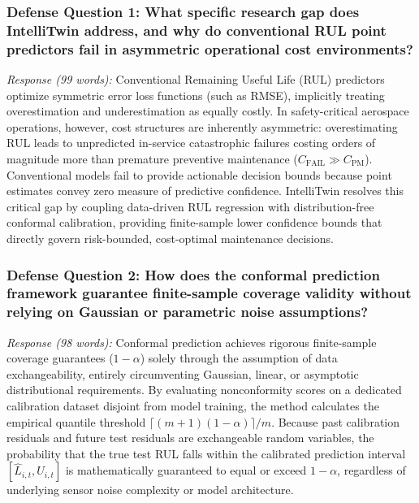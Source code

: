 \documentclass[12pt,a4paper]{article}
\begin{document}
\subsubsection*{Defense Question 1: What specific research gap does IntelliTwin address, and why do conventional RUL point predictors fail in asymmetric operational cost environments?}
\textit{Response (99 words):} Conventional Remaining Useful Life (RUL) predictors optimize symmetric error loss functions (such as RMSE), implicitly treating overestimation and underestimation as equally costly. In safety-critical aerospace operations, however, cost structures are inherently asymmetric: overestimating RUL leads to unpredicted in-service catastrophic failures costing orders of magnitude more than premature preventive maintenance ($C_{\text{FAIL}} \gg C_{\text{PM}}$). Conventional models fail to provide actionable decision bounds because point estimates convey zero measure of predictive confidence. IntelliTwin resolves this critical gap by coupling data-driven RUL regression with distribution-free conformal calibration, providing finite-sample lower confidence bounds that directly govern risk-bounded, cost-optimal maintenance decisions.

\subsubsection*{Defense Question 2: How does the conformal prediction framework guarantee finite-sample coverage validity without relying on Gaussian or parametric noise assumptions?}
\textit{Response (98 words):} Conformal prediction achieves rigorous finite-sample coverage guarantees ($1-\alpha$) solely through the assumption of data exchangeability, entirely circumventing Gaussian, linear, or asymptotic distributional requirements. By evaluating nonconformity scores on a dedicated calibration dataset disjoint from model training, the method calculates the empirical quantile threshold $\lceil (m+1)(1-\alpha) \rceil / m$. Because past calibration residuals and future test residuals are exchangeable random variables, the probability that the true test RUL falls within the calibrated prediction interval $[\hat{L}_{i,t}, \hat{U}_{i,t}]$ is mathematically guaranteed to equal or exceed $1-\alpha$, regardless of underlying sensor noise complexity or model architecture.
\end{document}
